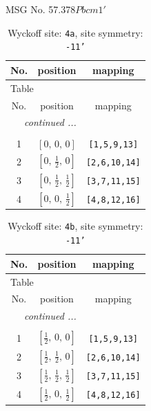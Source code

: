 \documentclass[fleqn,8pt]{jsarticle}
\begin{document}
\setcounter{MaxMatrixCols}{32}

\renewcommand{\tablename}{Table~}
\renewcommand{\figurename}{Figure~}
\begin{center}
\LARGE
MSG No. 57.378\quad$Pbcm1'$
\end{center}
\renewcommand{\arraystretch}{1.2}
\begin{longtable}{ccc}
\caption{Wyckoff site: {\tt 4a}, site symmetry: {\tt -11'}}
 \\
 \hline \hline
No. & position & mapping \\ \hline \endfirsthead

\multicolumn{2}{l}{\tablename\ \thetable{}} \\
 \hline \hline
No. & position & mapping \\ \hline \endhead

 \hline \hline
\multicolumn{2}{r}{\footnotesize\it continued ...} \\ \endfoot

 \hline \hline
\multicolumn{2}{r}{} \\ \endlastfoot

1 & $\left[ 0,\, 0,\, 0 \right]$ & {\tt [1,5,9,13]} \\ \hline
2 & $\left[ 0,\, \frac{1}{2},\, 0 \right]$ & {\tt [2,6,10,14]} \\ \hline
3 & $\left[ 0,\, \frac{1}{2},\, \frac{1}{2} \right]$ & {\tt [3,7,11,15]} \\ \hline
4 & $\left[ 0,\, 0,\, \frac{1}{2} \right]$ & {\tt [4,8,12,16]} \\
\end{longtable}
\renewcommand{\arraystretch}{1.2}
\begin{longtable}{ccc}
\caption{Wyckoff site: {\tt 4b}, site symmetry: {\tt -11'}}
 \\
 \hline \hline
No. & position & mapping \\ \hline \endfirsthead

\multicolumn{2}{l}{\tablename\ \thetable{}} \\
 \hline \hline
No. & position & mapping \\ \hline \endhead

 \hline \hline
\multicolumn{2}{r}{\footnotesize\it continued ...} \\ \endfoot

 \hline \hline
\multicolumn{2}{r}{} \\ \endlastfoot

1 & $\left[ \frac{1}{2},\, 0,\, 0 \right]$ & {\tt [1,5,9,13]} \\ \hline
2 & $\left[ \frac{1}{2},\, \frac{1}{2},\, 0 \right]$ & {\tt [2,6,10,14]} \\ \hline
3 & $\left[ \frac{1}{2},\, \frac{1}{2},\, \frac{1}{2} \right]$ & {\tt [3,7,11,15]} \\ \hline
4 & $\left[ \frac{1}{2},\, 0,\, \frac{1}{2} \right]$ & {\tt [4,8,12,16]} \\
\end{longtable}
\end{document}
